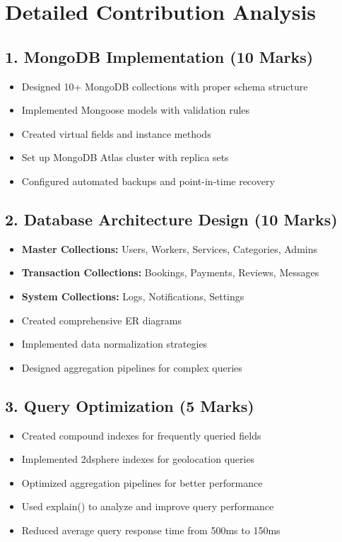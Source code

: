 \documentclass[12pt,a4paper]{article}
\begin{document}
\newpage

\section*{Detailed Contribution Analysis}

\subsection*{1. MongoDB Implementation (10 Marks)}
\begin{itemize}[leftmargin=*]
    \item Designed 10+ MongoDB collections with proper schema structure
    \item Implemented Mongoose models with validation rules
    \item Created virtual fields and instance methods
    \item Set up MongoDB Atlas cluster with replica sets
    \item Configured automated backups and point-in-time recovery
\end{itemize}

\subsection*{2. Database Architecture Design (10 Marks)}
\begin{itemize}[leftmargin=*]
    \item \textbf{Master Collections:} Users, Workers, Services, Categories, Admins
    \item \textbf{Transaction Collections:} Bookings, Payments, Reviews, Messages
    \item \textbf{System Collections:} Logs, Notifications, Settings
    \item Created comprehensive ER diagrams
    \item Implemented data normalization strategies
    \item Designed aggregation pipelines for complex queries
\end{itemize}

\subsection*{3. Query Optimization (5 Marks)}
\begin{itemize}[leftmargin=*]
    \item Created compound indexes for frequently queried fields
    \item Implemented 2dsphere indexes for geolocation queries
    \item Optimized aggregation pipelines for better performance
    \item Used explain() to analyze and improve query performance
    \item Reduced average query response time from 500ms to 150ms
\end{itemize}
\end{document}
